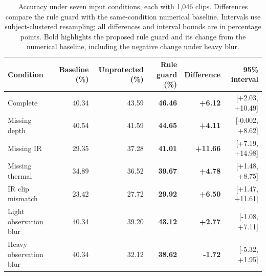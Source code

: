 \documentclass[a4paper]{article}
\begin{document}
\clearpage
\begin{table}[htbp]
\caption{Accuracy under seven input conditions, each with 1,046 clips. Differences compare the rule guard with the same-condition numerical baseline. Intervals use subject-clustered resampling; all differences and interval bounds are in percentage points. Bold highlights the proposed rule guard and its change from the numerical baseline, including the negative change under heavy blur.}
\label{tab:results_robustness}
\centering\small
\begin{tabular}{@{}lrrrrr@{}}
\toprule
Condition & Baseline (\%) & Unprotected (\%) & Rule guard (\%) & Difference & 95\% interval \\
\midrule
Complete & 40.34 & 43.59 & \textbf{46.46} & \textbf{+6.12} & [+2.03, +10.49] \\
Missing depth & 40.54 & 41.59 & \textbf{44.65} & \textbf{+4.11} & [-0.002, +8.62] \\
Missing IR & 29.35 & 37.28 & \textbf{41.01} & \textbf{+11.66} & [+7.19, +14.98] \\
Missing thermal & 34.89 & 36.52 & \textbf{39.67} & \textbf{+4.78} & [+1.48, +8.75] \\
IR clip mismatch & 23.42 & 27.72 & \textbf{29.92} & \textbf{+6.50} & [+1.47, +11.61] \\
Light observation blur & 40.34 & 39.20 & \textbf{43.12} & \textbf{+2.77} & [-1.08, +7.11] \\
Heavy observation blur & 40.34 & 32.12 & \textbf{38.62} & \textbf{-1.72} & [-5.32, +1.95] \\
\bottomrule
\end{tabular}
\end{table}

\clearpage
\end{document}
